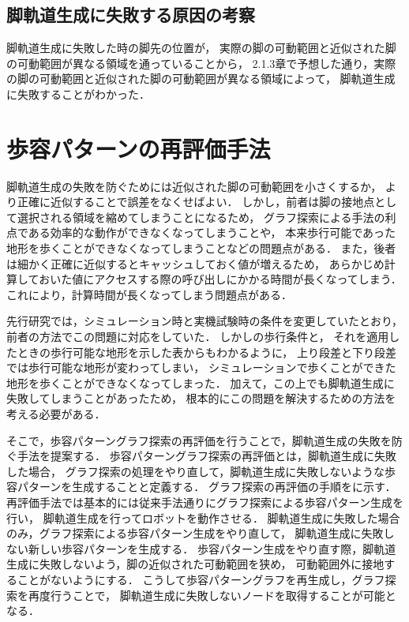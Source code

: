 \subsection{脚軌道生成に失敗する原因の考察}
脚軌道生成に失敗した時の脚先の位置が，
実際の脚の可動範囲と近似された脚の可動範囲が異なる領域を通っていることから，
2.1.3章で予想した通り，実際の脚の可動範囲と近似された脚の可動範囲が異なる領域によって，
脚軌道生成に失敗することがわかった．

\section{歩容パターンの再評価手法}
脚軌道生成の失敗を防ぐためには近似された脚の可動範囲を小さくするか，
より正確に近似することで誤差をなくせばよい．
しかし，前者は脚の接地点として選択される領域を縮めてしまうことになるため，
グラフ探索による手法の利点である効率的な動作ができなくなってしまうことや，
本来歩行可能であった地形を歩くことができなくなってしまうことなどの問題点がある．
また，後者は細かく正確に近似するとキャッシュしておく値が増えるため，
あらかじめ計算しておいた値にアクセスする際の呼び出しにかかる時間が長くなってしまう．
これにより，計算時間が長くなってしまう問題点がある．

先行研究では，シミュレーション時と実機試験時の条件を変更していたとおり，
前者の方法でこの問題に対応をしていた．
しかしの歩行条件と，
それを適用したときの歩行可能な地形を示した表からもわかるように，
上り段差と下り段差では歩行可能な地形が変わってしまい，
シミュレーションで歩くことができた地形を歩くことができなくなってしまった．
加えて，この上でも脚軌道生成に失敗してしまうことがあったため，
根本的にこの問題を解決するための方法を考える必要がある．

そこで，歩容パターングラフ探索の再評価を行うことで，脚軌道生成の失敗を防ぐ手法を提案する．
歩容パターングラフ探索の再評価とは，脚軌道生成に失敗した場合，
グラフ探索の処理をやり直して，脚軌道生成に失敗しないような歩容パターンを生成することと定義する．
グラフ探索の再評価の手順をに示す．
再評価手法では基本的には従来手法通りにグラフ探索による歩容パターン生成を行い，
脚軌道生成を行ってロボットを動作させる．
脚軌道生成に失敗した場合のみ，グラフ探索による歩容パターン生成をやり直して，
脚軌道生成に失敗しない新しい歩容パターンを生成する．
歩容パターン生成をやり直す際，脚軌道生成に失敗しないよう，脚の近似された可動範囲を狭め，
可動範囲外に接地することがないようにする．
こうして歩容パターングラフを再生成し，グラフ探索を再度行うことで，
脚軌道生成に失敗しないノードを取得することが可能となる．


